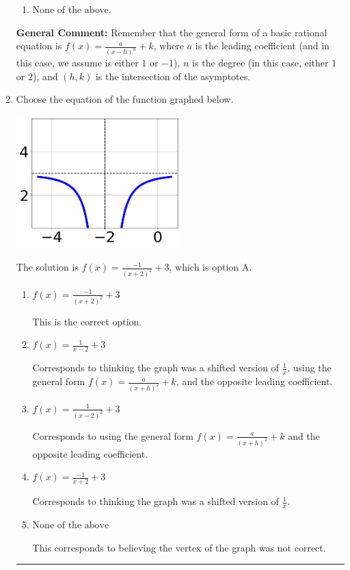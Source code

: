 \documentclass{extbook}[14pt]
\newcommand{\litem}[1]{\item #1

\rule{\textwidth}{0.4pt}}
\begin{document}
\begin{enumerate}
{\begin{enumerate}[label=\Alph*.]
\begin{multicols}{2}
\end{multicols}\item None of the above.\end{enumerate}
\textbf{General Comment:} Remember that the general form of a basic rational equation is $ f(x) = \frac{a}{(x-h)^n} + k$, where $a$ is the leading coefficient (and in this case, we assume is either $1$ or $-1$), $n$ is the degree (in this case, either $1$ or $2$), and $(h, k)$ is the intersection of the asymptotes.
}
\litem{
Choose the equation of the function graphed below.

\begin{center}
    \includegraphics[width=0.5\textwidth]{../Figures/rationalGraphToEquationCopyA.png}
\end{center}


The solution is \( f(x) = \frac{-1}{(x + 2)^2} + 3 \), which is option A.\begin{enumerate}[label=\Alph*.]
\item \( f(x) = \frac{-1}{(x + 2)^2} + 3 \)

This is the correct option.
\item \( f(x) = \frac{1}{x - 2} + 3 \)

Corresponds to thinking the graph was a shifted version of $\frac{1}{x}$, using the general form $f(x) = \frac{a}{(x+h)^2}+k$, and the opposite leading coefficient.
\item \( f(x) = \frac{1}{(x - 2)^2} + 3 \)

Corresponds to using the general form $f(x) = \frac{a}{(x+h)^2}+k$ and the opposite leading coefficient.
\item \( f(x) = \frac{-1}{x + 2} + 3 \)

Corresponds to thinking the graph was a shifted version of $\frac{1}{x}$.
\item \( \text{None of the above} \)

This corresponds to believing the vertex of the graph was not correct.
\end{enumerate}

}
\end{enumerate}
\end{document}
